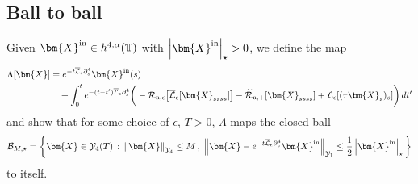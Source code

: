 \documentclass[11pt,reqno]{amsart}
\newcommand{\T}{\mathbb{T}}
\newcommand{\X}{\bm{X}}
\newcommand{\p}{\partial}
\newcommand{\abs}[1]{\left\lvert #1 \right\rvert}
\newcommand{\norm}[1]{\left\lVert #1 \right\rVert}
\newcommand{\wt}[1]{\widetilde{#1}}
\newcommand{\mc}[1]{\mathcal{#1}}
\theoremstyle{definition}
\begin{document}
\subsection{Ball to ball}
Given $\X^{\rm in}\in h^{4,\alpha}(\T)$ with $\abs{\X^{\rm in}}_\star>0$, we define the map
\begin{equation}\label{eq:Lambda_def}
\begin{aligned}
  \Lambda[\X] &= e^{-t\overline{\mc{L}}_\epsilon\p_s^4}\X^{\rm in}(s) \\
&\quad + \int_0^t e^{-(t-t')\overline{\mc{L}}_\epsilon\p_s^4}\bigg(-\mc{R}_{\rm n,\epsilon}\big[\overline{\mc{L}}_\epsilon[\X_{ssss}]\big] - \wt{\mc{R}}_{\rm n,+}[\X_{ssss}]+ \mc{L}_\epsilon[(\tau\X_s)_s]\bigg)\,dt'
\end{aligned}
\end{equation}
and show that for some choice of $\epsilon$, $T>0$, $\Lambda$ maps the closed ball
\begin{equation}
  \mc{B}_{M,\star} = \bigg\{ \X\in \mc{Y}_4(T)\,: \, \norm{\X}_{\mc{Y}_4}\le M\,, \; \norm{\X-e^{-t\overline{\mc{L}}_\epsilon\p_s^4}\X^{\rm in}}_{\mc{Y}_1}\le \frac{1}{2}\abs{\X^{\rm in}}_\star \bigg\} 
\end{equation}
to itself. 
\end{document}
